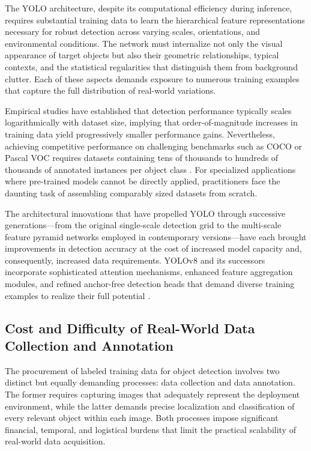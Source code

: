 The YOLO architecture, despite its computational efficiency during inference, requires substantial training data to learn the hierarchical feature representations necessary for robust detection across varying scales, orientations, and environmental conditions. The network must internalize not only the visual appearance of target objects but also their geometric relationships, typical contexts, and the statistical regularities that distinguish them from background clutter. Each of these aspects demands exposure to numerous training examples that capture the full distribution of real-world variations.

Empirical studies have established that detection performance typically scales logarithmically with dataset size, implying that order-of-magnitude increases in training data yield progressively smaller performance gains. Nevertheless, achieving competitive performance on challenging benchmarks such as COCO or Pascal VOC requires datasets containing tens of thousands to hundreds of thousands of annotated instances per object class \cite{lin2014coco}. For specialized applications where pre-trained models cannot be directly applied, practitioners face the daunting task of assembling comparably sized datasets from scratch.

The architectural innovations that have propelled YOLO through successive generations---from the original single-scale detection grid to the multi-scale feature pyramid networks employed in contemporary versions---have each brought improvements in detection accuracy at the cost of increased model capacity and, consequently, increased data requirements. YOLOv8 and its successors incorporate sophisticated attention mechanisms, enhanced feature aggregation modules, and refined anchor-free detection heads that demand diverse training examples to realize their full potential \cite{jocher2023yolov8}.

\subsection{Cost and Difficulty of Real-World Data Collection and Annotation}
\label{subsec:data_collection_cost}

The procurement of labeled training data for object detection involves two distinct but equally demanding processes: data collection and data annotation. The former requires capturing images that adequately represent the deployment environment, while the latter demands precise localization and classification of every relevant object within each image. Both processes impose significant financial, temporal, and logistical burdens that limit the practical scalability of real-world data acquisition.

